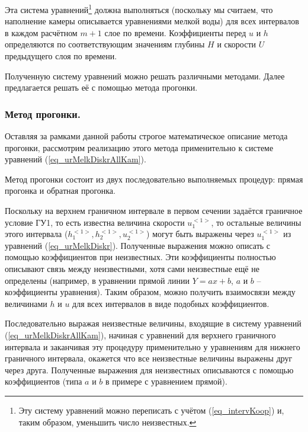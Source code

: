 Эта система уравнений\footnote{Эту систему уравнений можно переписать с учётом (\ref{eq_intervKoop}) и, таким образом, уменьшить число неизвестных.} должна выполняться (поскольку мы считаем, что наполнение камеры описывается уравнениями мелкой воды) для всех интервалов в каждом расчётном $m+1$ слое по времени. Коэффициенты перед $u$ и $h$ определяются по соответствующим значениям глубины $H$ и скорости $U$ предыдущего слоя по времени.

Полученную систему уравнений можно решать различными методами. Далее предлагается решать её с помощью метода прогонки.





\subsubsection{Метод прогонки.}

Оставляя за рамками данной работы строгое математическое описание метода прогонки, рассмотрим реализацию этого метода применительно к системе уравнений (\ref{eq_urMelkDiskrAllKam}).

Метод прогонки состоит из двух последовательно выполняемых процедур: прямая прогонка и обратная прогонка.

Поскольку на верхнем граничном интервале в первом сечении задаётся граничное условие ГУ1, то есть известна величина скорости $u_1^{<1>}$, то остальные величины этого интервала ($h_1^{<1>}, h_2^{<1>}, u_2^{<1>}$) могут быть выражены через $u_1^{<1>}$ из уравнений (\ref{eq_urMelkDiskr}). Полученные выражения можно описать с помощью коэффициентов при неизвестных. Эти коэффициенты полностью описывают связь между неизвестными, хотя сами неизвестные ещё не определены (например, в уравнении прямой линии $Y = ax+b$, $a$ и $b$ -- коэффициенты уравнения). Таким образом, можно получить взаимосвязи между величинами $h$ и $u$ для всех интервалов в виде подобных коэффициентов.

Последовательно выражая неизвестные величины, входящие в систему уравнений (\ref{eq_urMelkDiskrAllKam}), начиная с уравнений для верхнего граничного интервала и заканчивая эту процедуру применительно у уравнениям для нижнего граничного интервала, окажется что все неизвестные величины выражены друг через друга. Полученные выражения для неизвестных описываются с помощью коэффициентов (типа $a$ и $b$ в примере с уравнением прямой).

